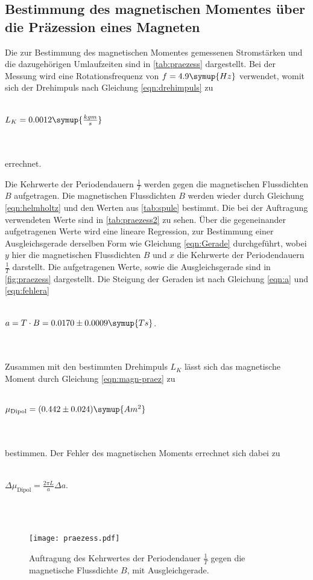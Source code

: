     \subsection{Bestimmung des magnetischen Momentes über die Präzession eines Magneten}
        Die zur Bestimmung des magnetischen Momentes gemessenen Stromstärken und die dazugehörigen Umlaufzeiten sind in \autoref{tab:praezess}
        dargestellt. Bei der Messung wird eine Rotationsfrequenz von $f = 4.9 \symup{Hz}$  verwendet, womit sich der Drehimpuls nach
        Gleichung \eqref{eqn:drehimpuls} zu 
        \\ \\
        \centerline{$L_K = 0.0012 \symup{\frac{kg m}{s}}$}
        \\ \\
        errechnet. 
        
        Die Kehrwerte der Periodendauern $\frac{1}{T}$ werden gegen die magnetischen Flussdichten $B$ aufgetragen.
        Die magnetischen Flussdichten $B$ werden wieder durch Gleichung \eqref{eqn:helmholtz} und den Werten aus \autoref{tab:spule}
        bestimmt. Die bei der Auftragung verwendeten Werte sind in \autoref{tab:praezess2} zu sehen. Über die gegeneinander 
        aufgetragenen Werte wird eine lineare Regression, zur Bestimmung einer Ausgleichsgerade derselben Form wie Gleichung \eqref{eqn:Gerade} durchgeführt,
        wobei $y$ hier die magnetischen Flussdichten $B$ und $x$ die Kehrwerte der Periodendauern $\frac{1}{T}$  darstellt.
        Die aufgetragenen Werte, sowie die Ausgleichsgerade sind in \autoref{fig:praezess} dargestellt.
        Die Steigung der Geraden ist nach Gleichung \eqref{eqn:a} und \eqref{eqn:fehlera}
        \\ \\
        \centerline{$a = T \cdot B = 0.0170 \pm 0.0009 \symup{T s}$.}
        \\ \\
        Zusammen mit den bestimmten Drehimpuls $L_K$ lässt sich das magnetische Moment durch Gleichung \eqref{eqn:magn-praez} zu
        \\ \\
        \centerline{$\mu_\text{Dipol} = (0.442 \pm 0.024) \symup{A m^2}$}
        \\ \\
        bestimmen.
        Der Fehler des magnetischen Moments errechnet sich dabei zu 
        \\ \\ 
        \centerline{$\Delta\mu_\text{Dipol} = \frac{2 \pi L}{a} \Delta a $.}
        \\ \\
        
          \begin{figure}
        \centering
        \texttt{[image: praezess.pdf]}
        \caption{Auftragung des Kehrwertes der Periodendauer $\frac{1}{T}$ gegen die magnetische Flussdichte $B$, mit Ausgleichgerade.}
        \label{fig:praezess}
    \end{figure}